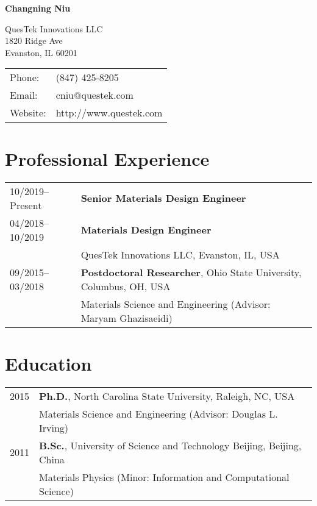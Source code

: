 \documentclass[letterpaper,11pt]{article}
\def\name{Changning Niu}
\begin{document}
\thispagestyle{empty}
\centerline{\huge \bf \sc \name}

\vspace{0.25in}

\begin{minipage}{0.50\linewidth}
  QuesTek Innovations LLC \\
  1820 Ridge Ave\\
  Evanston, IL 60201
\end{minipage}
\begin{minipage}{0.50\linewidth}
  \begin{tabular}{ll}
    Phone: & (847) 425-8205 \\
    Email: & cniu@questek.com \\
    Website: & http://www.questek.com \\
  \end{tabular}
\end{minipage}


\section*{Professional Experience}

\begin{tabular}{ll}
10/2019--Present & \textbf{Senior Materials Design Engineer} \\
04/2018--10/2019 & \textbf{Materials Design Engineer} \\
                 & QuesTek Innovations LLC, Evanston, IL, USA\\
09/2015--03/2018 & \textbf{Postdoctoral Researcher}, Ohio State University, Columbus, OH, USA \\
		   & Materials Science and Engineering (Advisor: Maryam Ghazisaeidi)
\end{tabular}


\section*{Education}

\begin{tabular}{ll}
	2015 & {\bf Ph.D.}, North Carolina State University, Raleigh, NC, USA \\
	     & Materials Science and Engineering (Advisor: Douglas L. Irving) \\
	2011 & {\bf B.Sc.}, University of Science and Technology Beijing, Beijing, China \\
		 & Materials Physics (Minor: Information and Computational Science) \\
\end{tabular}
\end{document}
